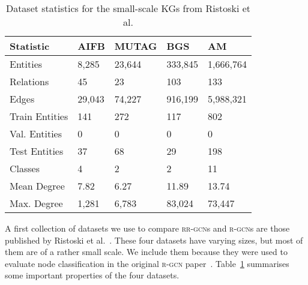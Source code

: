 \documentclass{llncs}
\begin{document}
\setlength{\tabcolsep}{8pt}
\begin{table}[h!]
\begin{center}
 
\begin{tabular}{lllll}\toprule
 \textbf{Statistic}           & \textbf{AIFB} & \textbf{MUTAG}   & \textbf{BGS} & \textbf{AM}\\\midrule
Entities  &  8,285  & 23,644  & 333,845 & 1,666,764 \\
Relations  & 45  & 23  & 103 & 133  \\
Edges  &  29,043 & 74,227 & 916,199 & 5,988,321 \\
Train Entities  & 141  &  272 & 117 & 802  \\
Val. Entities  & 0 & 0 & 0 & 0  \\
Test Entities  & 37  & 68 & 29 &  198 \\
Classes  & 4  & 2  & 2 & 11 \\
Mean Degree & 7.82 & 6.27 & 11.89 & 13.74 \\
Max. Degree & 1,281 & 6,783 & 83,024 & 73,447 \\ \bottomrule
\end{tabular}
\end{center}
\caption{Dataset statistics for the small-scale KGs from Ristoski et al.\label{table:statistics}}
\end{table}

A first collection of datasets we use to compare \textsc{rr-gcn}s and \textsc{r-gcn}s are those published by Ristoski et al.~\cite{ristoski2016collection}. These four datasets have varying sizes, but most of them are of a rather small scale. We include them because they were used to evaluate node classification in the original \textsc{r-gcn} paper~\cite{schlichtkrull2018modeling}. Table~\ref{table:statistics} summarises some important properties of the four datasets.
\end{document}
